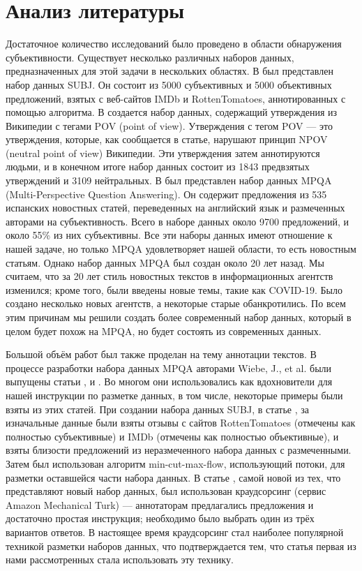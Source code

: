 \documentclass[a4paper,14pt]{extarticle}
\begin{document}
    \section{Анализ литературы}
    Достаточное количество исследований было проведено в области обнаружения субъективности. Существует несколько различных наборов данных, предназначенных для этой задачи в нескольких областях. В \cite{subj} был представлен набор данных SUBJ. Он состоит из 5000 субъективных и 5000 объективных предложений, взятых с веб-сайтов IMDb и RottenTomatoes, аннотированных с помощью алгоритма. В \cite{wikipedia-biased-statements} создается набор данных, содержащий утверждения из Википедии с тегами POV (point of view). Утверждения с тегом POV — это утверждения, которые, как сообщается в статье, нарушают принцип NPOV (neutral point of view) Википедии. Эти утверждения затем аннотируются людьми, и в конечном итоге набор данных состоит из 1843 предвзятых утверждений и 3109 нейтральных. В \cite{mpqa} был представлен набор данных MPQA (Multi-Perspective Question Answering). Он содержит предложения из 535 испанских новостных статей, переведенных на английский язык и размеченных авторами на субъективность. Всего в наборе данных около 9700 предложений, и около 55\% из них субъективны. Все эти наборы данных имеют отношение к нашей задаче, но только MPQA удовлетворяет нашей области, то есть новостным статьям. Однако набор данных MPQA был создан около 20 лет назад. Мы считаем, что за 20 лет стиль новостных текстов в информационных агентств изменился; кроме того, были введены новые темы, такие как COVID-19. Было создано несколько новых агентств, а некоторые старые обанкротились. По всем этим причинам мы решили создать более современный набор данных, который в целом будет похож на MPQA, но будет состоять из современных данных.
    
    Большой объём работ был также проделан на тему аннотации текстов. В процессе разработки набора данных MPQA авторами Wiebe, J., et al. были выпущены статьи \cite{instructions-for-annotating-opinions}, \cite{annotating-expressions-of-opinions} и \cite{annotating-private-states}. Во многом они использовались как вдохновители для нашей инструкции по разметке данных, в том числе, некоторые примеры были взяты из этих статей. При создании набора данных SUBJ, в статье \cite{subj}, за изначальные данные были взяты отзывы с сайтов RottenTomatoes (отмечены как полностью субъективные) и IMDb (отмечены как полностью объективные), и взяты близости предложений из неразмеченного набора данных с размеченными. Затем был использован алгоритм min-cut-max-flow, использующий потоки, для разметки оставшейся части набора данных. В статье \cite{wikipedia-biased-statements}, самой новой из тех, что представляют новый набор данных, был использован краудсорсинг (сервис Amazon Mechanical Turk) --- аннотаторам предлагались предложения и достаточно простая инструкция; необходимо было выбрать один из трёх вариантов ответов. В настоящее время краудсорсинг стал наиболее популярной техникой разметки наборов данных, что подтверждается тем, что статья \cite{wikipedia-biased-statements} первая из нами рассмотренных стала использовать эту технику.
    
\end{document}
